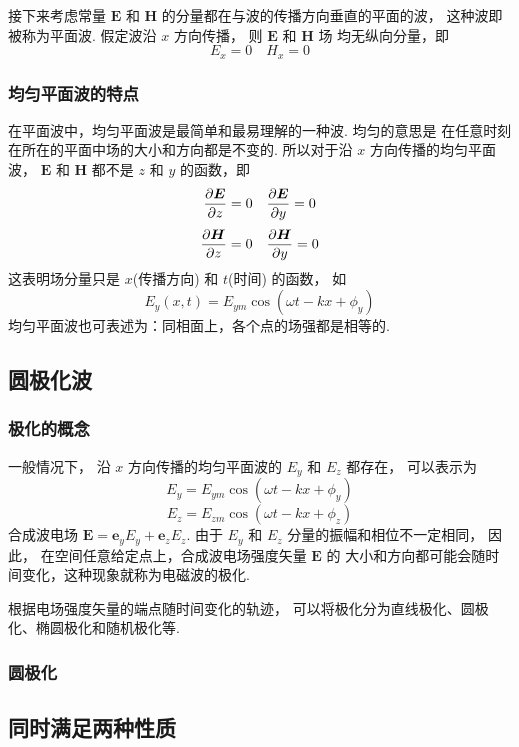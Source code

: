 \documentclass[UTF8,linespread=1.236]{ctexart}
\newcommand\cu[1]{\boldsymbol{#1}}
\newcommand\vecE{\cu{E}}
\newcommand\vecH{\cu{H}}
\newcommand\pypx[2]{{{\partial {#1}} \over {\partial {#2}}}}
\begin{document}
接下来考虑常量 $\vecE$ 和 $\vecH$ 的分量都在与波的传播方向垂直的平面的波，
这种波即被称为平面波.
假定波沿 $x$ 方向传播，
则 $\vecE$ 和 $\vecH$ 场
均无纵向分量，即
\begin{equation*}
    E_x = 0 \quad H_x = 0
\end{equation*}

\subsubsection{均匀平面波的特点}
在平面波中，均匀平面波是最简单和最易理解的一种波.
均匀的意思是
在任意时刻在所在的平面中场的大小和方向都是不变的.
所以对于沿 $x$ 方向传播的均匀平面波，
$\vecE$ 和 $\vecH$ 都不是 $z$ 和 $y$ 的函数，即
\begin{equation*}
    \pypx{\vecE}{z} = 0 \quad \pypx{\vecE}{y} = 0
\end{equation*}
\begin{equation*}
    \pypx{\vecH}{z} = 0 \quad \pypx{\vecH}{y} = 0
\end{equation*}
这表明场分量只是 $x$(传播方向) 和 $t$(时间) 的函数，
如
\begin{equation}
    E_y(x,t) = E_{ym}\cos{(\omega t - kx + \phi_y)}
\end{equation}
均匀平面波也可表述为：同相面上，各个点的场强都是相等的.

\subsection{圆极化波}

\subsubsection{极化的概念}
\newcommand\phase[1]{\omega t - kx + \phi_{#1}}
一般情况下，
沿 $x$ 方向传播的均匀平面波的 $E_y$ 和 $E_z$ 都存在，
可以表示为
\begin{equation}
    E_y = E_{ym}\cos{(\phase{y})}
\end{equation}
\begin{equation}
    E_z = E_{zm}\cos{(\phase{z})}
\end{equation}
合成波电场 $\vecE = \cu{e}_yE_y + \cu{e}_zE_z$.
由于 $E_y$ 和 $E_z$ 分量的振幅和相位不一定相同，
因此，
在空间任意给定点上，合成波电场强度矢量 $\vecE$ 的
大小和方向都可能会随时间变化，这种现象就称为电磁波的极化.

根据电场强度矢量的端点随时间变化的轨迹，
可以将极化分为直线极化、圆极化、椭圆极化和随机极化等.

\subsubsection{圆极化}



\subsection{同时满足两种性质}


\end{document}
